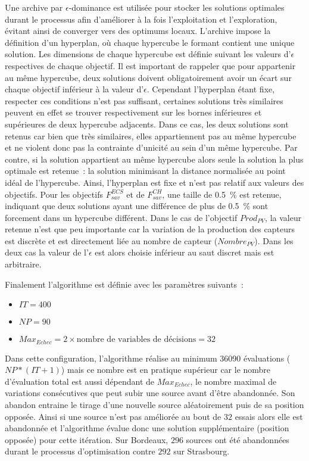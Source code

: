 Une archive par $\epsilon$-dominance est utilisée pour stocker les solutions optimales
durant le processus afin d’améliorer à la fois l’exploitation et l’exploration, évitant
ainsi de converger vers des optimums locaux. L’archive impose la définition d’un
hyperplan, où chaque hypercube le formant contient une unique solution. Les dimensions de chaque
hypercube est définie suivant les valeurs d’$\epsilon$ respectives de chaque objectif.
Il est important de rappeler que pour appartenir au même hypercube, deux solutions
doivent obligatoirement avoir un écart sur chaque objectif inférieur à la valeur d’$\epsilon$.
Cependant l’hyperplan étant fixe, respecter ces conditions n’est pas suffisant, certaines solutions
très similaires peuvent en effet se trouver respectivement sur les bornes inférieures
et supérieures de deux hypercube adjacents. Dans ce cas, les deux solutions sont retenus
car bien que très similaires, elles appartiennent pas au même hypercube et ne violent donc
pas la contrainte d’unicité au sein d’un même hypercube.
Par contre, si la solution appartient au même hypercube alors seule la solution la plus
optimale est retenue~: la solution minimisant la distance normalisée au point idéal de l’hypercube.
Ainsi, l’hyperplan est fixe et n’est pas relatif aux valeurs des objectifs.
Pour les objectifs $F_{sav}^{ECS}$ et de $F_{sav}^{CH}$, une taille de \SI{0.5}{\percent}
est retenue, indiquant que deux solutions ayant une différence de plus de
\SI{0.5}{\percent} sont forcement dans un hypercube différent. Dans le cas de l’objectif $Prod_{PV}$, la
valeur retenue n’est que peu importante car la variation de la production des capteurs
 est discrète et est directement liée au nombre de capteur  ($Nombre_{PV}$).
Dans les deux cas la valeur de l’$\epsilon$ est alors choisie inférieur au saut discret
mais est arbitraire.

\noindent Finalement l’algorithme est définie avec les paramètres suivants~:
\begin{itemize}
  \item $IT = 400$
  \item $NP = 90$
  \item $Max_{Echec} = 2 \times \text{nombre de variables de décisions} = 32$
\end{itemize}
Dans cette configuration, l’algorithme réalise au minimum \num{36090} évaluations ($NP *
(IT + 1)$) mais ce nombre est en pratique supérieur car le nombre d’évaluation total est aussi
dépendant de $Max_{Echec}$, le nombre maximal de variations consécutives que peut subir
une source avant d’être abandonnée. Son abandon entraine le tirage d’une nouvelle source
aléatoirement puis de sa position opposée. Ainsi si une source n’est pas améliorée au bout
de $32$ essais alors elle est abandonnée et l’algorithme évalue donc une solution
supplémentaire (position opposée) pour cette itération. Sur Bordeaux, $296$ sources ont
été abandonnées durant le processus d’optimisation contre $292$ sur Strasbourg.

